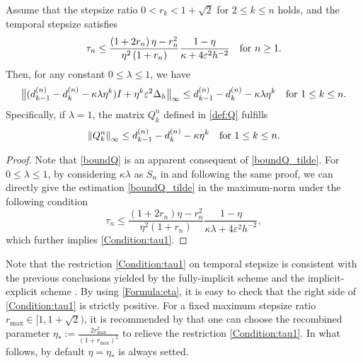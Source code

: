 \documentclass{m2an}
\begin{document}
\begin{lmm}\label{lem:boundQ} 
	Assume that the stepsize ratio $ 0 < r_k < 1 + \sqrt{2} $ for $2 \leq k \leq n$ holds, and the temporal stepsize satisfies
	\begin{equation}\label{Condition:tau1}
		\tau_n \leq \frac{\left(1+2 r_n\right) \eta-r_n^2}{\eta^2\left(1+r_n\right)} \frac{1-\eta}{ \kappa + 4 \varepsilon^2 h^{-2}} \quad {\rm for } \  n \geq 1.
	\end{equation}
	Then, for any constant $ 0 \leq \lambda \leq 1 $, we have
	\begin{equation}\label{boundQ_tilde}
		\big\| ( d^{(n)}_{k-1} - d^{(n)}_{k} - \kappa \lambda \eta^{k} )I + \eta^{k} \varepsilon^2 \Delta_h \big\|_{\infty} \leq d_{k-1}^{(n)}-d_k^{(n)} - \kappa \lambda \eta^k \quad {\rm for} \  1 \leq k \leq n.
	\end{equation}
	Specifically, if $ \lambda = 1 $, the matrix $Q_k^{n}$ defined in \eqref{def:Q} fulfills
	\begin{equation}\label{boundQ}
		\left\|Q_k^{n}\right\|_{\infty} \leq d_{k-1}^{(n)}-d_k^{(n)} - \kappa \eta^k \quad {\rm for } \  1 \leq k \leq n .
	\end{equation}
\end{lmm}
\begin{proof}
	Note that \eqref{boundQ} is an apparent consequent of \eqref{boundQ_tilde}. For $ 0 \leq \lambda \leq 1 $, by considering $ \kappa \lambda $ as $ S_n $ in \cite[Lemma 4.1]{SINUM_2020_Liao} and following the same proof, we can directly give the estimation \eqref{boundQ_tilde}
	in the maximum-norm under the following condition
	$$
	\tau_n \leq \frac{\left(1+2 r_n\right) \eta-r_n^2}{\eta^2\left(1+r_n\right)} \frac{1-\eta}{ \kappa \lambda + 4 \varepsilon^2 h^{-2}},
	$$
	which further implies \eqref{Condition:tau1}.
\end{proof}

\begin{rmrk}\label{rem:eta} 
	Note that the restriction \eqref{Condition:tau1} on temporal stepsize is consistent with the previous conclusions yielded by the fully-implicit scheme \cite{SINUM_2020_Liao} and the implicit-explicit scheme \cite{MOC_2023_Ju}. By using \eqref{Formula:eta}, it is easy to check that the right side of  \eqref{Condition:tau1} is strictly positive. For a fixed maximum stepsize ratio $ r_{\max} \in [1, 1 + \sqrt{2}) $, it is recommended by \cite{SINUM_2020_Liao} that one can choose the recombined parameter 
		$\eta_{*} := \frac{2 r_{\max}^2}{\left(1+r_{\max}\right)^2}$
	to relieve the restriction  \eqref{Condition:tau1}.
	In what follows, by default $ \eta = \eta_{*} $ is always setted.
\end{rmrk}
\end{document}
